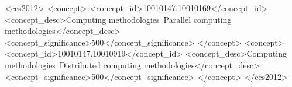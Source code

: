 \begin{abstract}
\end{abstract}

%
%

\begin{CCSXML}
<ccs2012>
 <concept>
  <concept_id>10010147.10010169</concept_id>
  <concept_desc>Computing methodologies~Parallel computing methodologies</concept_desc>
  <concept_significance>500</concept_significance>
 </concept>
 <concept>
  <concept_id>10010147.10010919</concept_id>
  <concept_desc>Computing methodologies~Distributed computing methodologies</concept_desc>
  <concept_significance>500</concept_significance>
 </concept>
</ccs2012>
\end{CCSXML}





